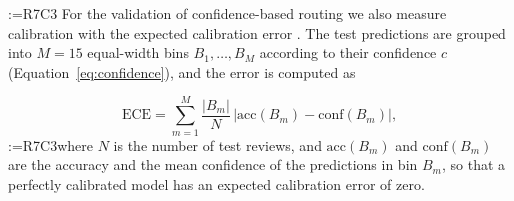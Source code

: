 \documentclass[a4paper,fleqn]{cas-sc}
\makeatletter
\newif\iftracked
\newcommand{\rv@setcolour}[1]{%
  \IfStrEq{#1}{R7C7}{\color{rvEdit}}{%
    \IfSubStr{#1}{R5}{\IfSubStr{#1}{R7}{\color{rvBoth}}{\color{rvFive}}}{\color{rvSeven}}}}
\newcommand{\rv@tag}[1]{\textsuperscript{\sffamily\bfseries\scriptsize[\StrSubstitute{#1}{,}{, }]}\,}
\newcommand{\rv@recordone}[1]{%
  \edef\rv@i{#1}%
  \ifcsdef{rv@n@\rv@i}{}{\csgdef{rv@n@\rv@i}{0}}%
  \csxdef{rv@n@\rv@i}{\the\numexpr\csuse{rv@n@\rv@i}+1\relax}%
  \begingroup\edef\@currentlabel{\rv@i}\label{rv:\rv@i:\csuse{rv@n@\rv@i}}\endgroup}
\newcommand{\rv@record}[1]{\@for\rv@id:=#1\do{\expandafter\rv@recordone\expandafter{\rv@id}}}
\DeclareRobustCommand{\rc}[2]{\rv@record{#1}\iftracked{\rv@setcolour{#1}\rv@tag{#1}#2}\else#2\fi}
\DeclareRobustCommand{\rcm}[2]{\iftracked{\rv@setcolour{#1}#2}\else#2\fi}
\newenvironment{rcblock}[1]{\rv@record{#1}\iftracked\rv@setcolour{#1}\leavevmode\rv@tag{#1}\fi\ignorespaces}{\par}
\makeatother
\begin{document}
\begin{rcblock}{R7C3}
For the validation of confidence-based routing we also measure calibration with the expected calibration error \citep{guo2017calibration}. The test predictions are grouped into $M = 15$ equal-width bins $B_1,\ldots,B_M$ according to their confidence $c$ (Equation~\eqref{eq:confidence}), and the error is computed as
\end{rcblock}
\begin{equation}
\rcm{R7C3}{\mathrm{ECE} = \sum_{m=1}^{M} \frac{|B_m|}{N}\,\bigl|\mathrm{acc}(B_m) - \mathrm{conf}(B_m)\bigr|,}
\label{eq:ece}
\end{equation}
\rc{R7C3}{where $N$ is the number of test reviews, and $\mathrm{acc}(B_m)$ and $\mathrm{conf}(B_m)$ are the accuracy and the mean confidence of the predictions in bin $B_m$, so that a perfectly calibrated model has an expected calibration error of zero.}
\end{document}
